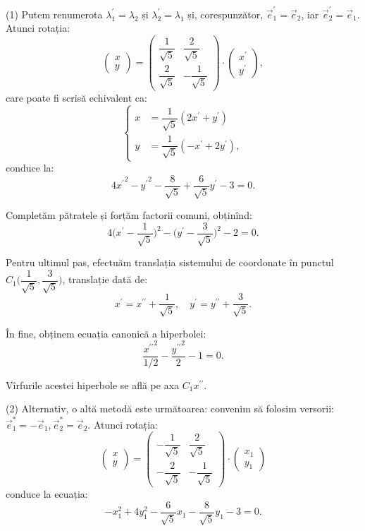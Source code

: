 \documentclass[11pt,a4paper]{article}
\theoremstyle{dotless}
\theoremstyle{dotlessdr}
\begin{document}
(1) Putem renumerota $\lambda_1^{\prime} = \lambda_2$ și $\lambda_2^{\prime} =
\lambda_1$ și, corespunzător, $\vec{e}_1^{\prime} = \vec{e}_2$, iar
$\vec{e}_2^{\prime} = \vec{e}_1$. Atunci rotația: 
 \[
	\begin{pmatrix}
	    x \\ y
    \end{pmatrix} = \begin{pmatrix}
   	        \dfrac{1}{\sqrt{5}} & \dfrac{2}{\sqrt{5}} \\
	        \dfrac{2}{\sqrt{5}} & - \dfrac{1}{\sqrt{5}}
                    \end{pmatrix} \cdot \begin{pmatrix}
	                                        x^{\prime} \\ y^{\prime}
                                        \end{pmatrix},
\]
care poate fi scrisă echivalent ca: 
 \[
    \begin{cases}
	x &= \dfrac{1}{\sqrt{5}}(2x^{\prime} + y^{\prime}) \\
	y &= \dfrac{1}{\sqrt{5}}(-x^{\prime} + 2y^{\prime}),
	\end{cases}
\]
conduce la: 
 \[
	4{x^{\prime}}^2 - {y^{\prime}}^2 - \dfrac{8}{\sqrt{5}} + \dfrac{6}{\sqrt{5}}
	y^{\prime} - 3 = 0.
\]

Completăm pătratele și forțăm factorii comuni, obținînd: 
 \[
	4 \Big( x^{\prime} - \dfrac{1}{\sqrt{5}} \Big)^2 - 
	\Big( y^{\prime} - \dfrac{3}{\sqrt{5}} \Big)^2 - 2 = 0.
\]

Pentru ultimul pas, efectuăm translația sistemului de coordonate în punctul
$C_1 \Big( \dfrac{1}{\sqrt{5}}, \dfrac{3}{\sqrt{5}} \Big)$, translație dată de: 
 \[
	x^{\prime} = x^{\prime\prime} + \dfrac{1}{\sqrt{5}}, \quad
	y^{\prime} = y^{\prime\prime} + \dfrac{3}{\sqrt{5}}.
\]

În fine, obținem ecuația canonică a hiperbolei: 
 \[
	\dfrac{{x^{\prime\prime}}^2}{1/2} - \dfrac{{y^{\prime\prime}}^2}{2} - 1 = 0.
\]

Vîrfurile acestei hiperbole se află pe axa $C_1 x^{\prime\prime}$. \vspace{1cm}

(2) Alternativ, o altă metodă este următoarea: convenim să folosim versorii:
$\vec{e}_1^\ast = -\vec{e}_1, \vec{e}_2^\ast = \vec{e}_2$. Atunci rotația: 
 \[
	\begin{pmatrix}
	    x \\ y
    \end{pmatrix} = \begin{pmatrix}
	                    -\dfrac{1}{\sqrt{5}} & \dfrac{2}{\sqrt{5}} \\
	                    -\dfrac{2}{\sqrt{5}} & -\dfrac{1}{\sqrt{5}}
                    \end{pmatrix} \cdot \begin{pmatrix}
	                                        x_1 \\ y_1 
                                        \end{pmatrix}
\]
conduce la ecuația: 
 \[
	-x_1^2 + 4y_1^2 - \dfrac{6}{\sqrt{5}} x_1 - \dfrac{8}{\sqrt{5}} y_1 - 3 = 0.
\]
\end{document}
